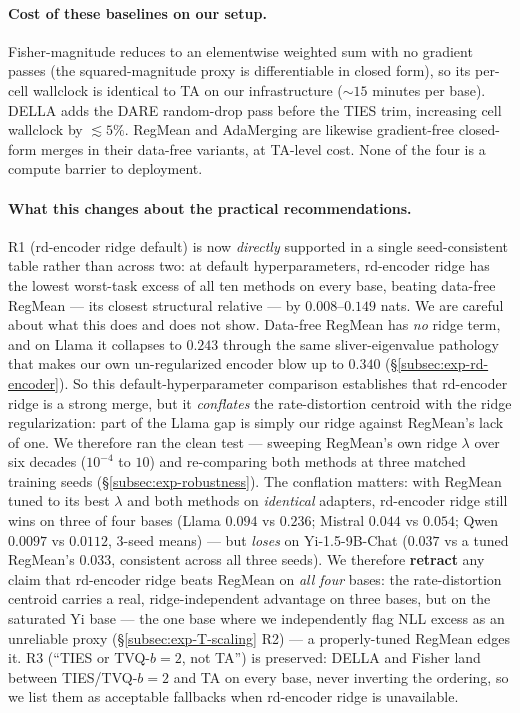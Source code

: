 \paragraph{Cost of these baselines on our setup.}
Fisher-magnitude reduces to an elementwise weighted sum with no
gradient passes (the squared-magnitude proxy is differentiable in
closed form), so its per-cell wallclock is identical to TA on our
infrastructure ($\sim 15$ minutes per base). DELLA adds the DARE
random-drop pass before the TIES trim, increasing cell wallclock by
$\lesssim 5\%$. RegMean and AdaMerging are likewise gradient-free
closed-form merges in their data-free variants, at TA-level cost. None
of the four is a compute barrier to deployment.

\paragraph{What this changes about the practical
recommendations.}
R1 (rd-encoder ridge default) is now \emph{directly} supported in a
single seed-consistent table rather than across two: at default
hyperparameters, rd-encoder ridge has the lowest worst-task excess of
all ten methods on every base, beating data-free RegMean --- its
closest structural relative --- by $0.008$--$0.149$ nats. We are
careful about what this does and does not show. Data-free RegMean has
\emph{no} ridge term, and on Llama it collapses to $0.243$ through the
same sliver-eigenvalue pathology that makes our own un-regularized
encoder blow up to $0.340$ (\S\ref{subsec:exp-rd-encoder}). So this
default-hyperparameter comparison establishes that rd-encoder ridge is
a strong merge, but it \emph{conflates} the rate-distortion centroid
with the ridge regularization: part of the Llama gap is simply our
ridge against RegMean's lack of one. We therefore ran the clean test
--- sweeping RegMean's own ridge $\lambda$ over six decades ($10^{-4}$
to $10$) and re-comparing both methods at three matched training seeds
(\S\ref{subsec:exp-robustness}). The conflation matters: with RegMean
tuned to its best $\lambda$ and both methods on \emph{identical}
adapters, rd-encoder ridge still wins on three of four bases (Llama
$0.094$ vs $0.236$; Mistral $0.044$ vs $0.054$; Qwen $0.0097$ vs
$0.0112$, $3$-seed means) --- but \emph{loses} on Yi-1.5-9B-Chat
($0.037$ vs a tuned RegMean's $0.033$, consistent across all three
seeds). We therefore \textbf{retract} any claim that rd-encoder ridge
beats RegMean on \emph{all four} bases: the rate-distortion centroid
carries a real, ridge-independent advantage on three bases, but on the
saturated Yi base --- the one base where we independently flag NLL
excess as an unreliable proxy (\S\ref{subsec:exp-T-scaling} R2) --- a
properly-tuned RegMean edges it. R3 (``TIES or TVQ-$b{=}2$, not
TA'') is preserved: DELLA and
Fisher land between TIES/TVQ-$b{=}2$ and TA on every base, never
inverting the ordering, so we list them as acceptable fallbacks when
rd-encoder ridge is unavailable.

